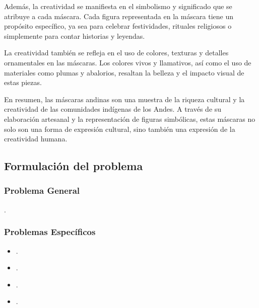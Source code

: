 \documentclass[12pt,a4paper]{article}
\begin{document}
Además, la creatividad se manifiesta en el simbolismo y significado que se atribuye a cada máscara. Cada figura representada en la máscara tiene un propósito específico, ya sea para celebrar festividades, rituales religiosos o simplemente para contar historias y leyendas.

La creatividad también se refleja en el uso de colores, texturas y detalles ornamentales en las máscaras. Los colores vivos y llamativos, así como el uso de materiales como plumas y abalorios, resaltan la belleza y el impacto visual de estas piezas.

En resumen, las máscaras andinas son una muestra de la riqueza cultural y la creatividad de las comunidades indígenas de los Andes. A través de su elaboración artesanal y la representación de figuras simbólicas, estas máscaras no solo son una forma de expresión cultural, sino también una expresión de la creatividad humana.



\subsection{Formulación del problema}
\subsubsection{Problema General}
\problema.
\subsubsection{Problemas Específicos}
\begin{itemize}
	\item \problemae.
	\item \problemaee.
	\item \problemaeee.
	\item \problemaeeee.
\end{itemize}

\end{document}

